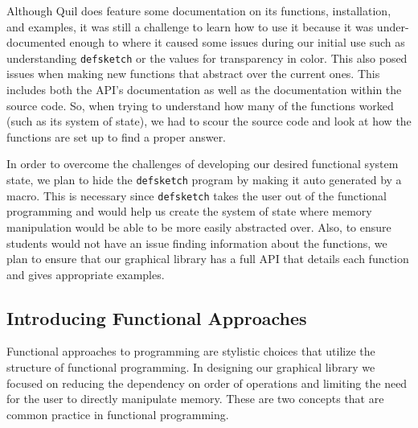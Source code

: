 \documentclass[12pt]{article}
\newcommand{\comment}[1]{{\bf \tt  {#1}}}
\newcommand{\emcomment}[1]{\textcolor{ForestGreen}{\comment{Elena: {#1}}}}
\newcommand{\todo}[1]{\textcolor{blue}{\comment{To Do: {#1}}}}
\begin{document}
Although Quil does feature some documentation on its functions, installation, and examples, it was still a challenge to learn how to use it because it was under-documented enough to where it caused some issues during our initial use such as understanding \texttt{defsketch} or the values for transparency in color.
This also posed issues when making new functions that abstract over the current ones. This includes both the API’s documentation as well as the documentation within the source code. So, when trying to understand how many of the functions worked (such as its system of state), we had to scour the source code and look at how the functions are set up to find a proper answer. 

In order to overcome the challenges of developing our desired functional system state, we plan to hide the \texttt{defsketch} program by making it auto generated by a macro. This is necessary since \texttt{defsketch} takes the user out of the functional programming and would help us create the system of state where memory manipulation would be able to be more easily abstracted over. Also, to ensure students would not have an issue finding information about the functions, we plan to ensure that our graphical library has a full API that details each function and gives appropriate examples. 

\subsection{Introducing Functional Approaches}\label{subsec:functional}
Functional approaches to programming are stylistic choices that utilize the structure of functional programming. In designing our graphical library we focused on reducing the dependency on order of operations and limiting the need for the user to directly manipulate memory. These are two concepts that are common practice in functional programming.
\end{document}
